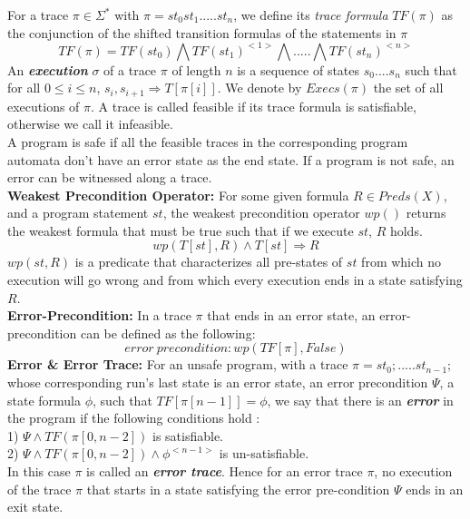\documentclass{article}
\begin{document}
For a trace $\pi \in \Sigma^*$ with $\pi = st_0st_1.....st_n$, we define its \textit{trace formula} $TF(\pi)$ as the conjunction of the shifted transition formulas of the statements in $\pi$
$$TF(\pi) = TF(st_0) \bigwedge TF(st_1)^{<1>} \bigwedge ..... \bigwedge TF(st_n)^{<n>}$$
An \textit{\textbf{execution}} $\sigma$ of a trace $\pi$ of length $n$ is a sequence of states $s_0....s_n$ such that for all $0 \leq i \leq n$, $s_i,s_{i+1} \Rightarrow T[\pi[i]]$. We denote by $Execs(\pi)$ the set of all executions of $\pi$.
A trace is called feasible if its trace formula is satisfiable, otherwise we call it infeasible. \\
A program is safe if all the feasible traces in the corresponding program automata don’t have an error state as the end state. If a program is not safe, an error can be witnessed along a trace.\\
\textbf{Weakest Precondition Operator:} For some given formula $R \in Preds(X)$, and a program statement $st$, the weakest precondition operator $wp()$ returns the weakest formula that must be true such that if we execute $st$, $R$ holds. 
$$wp(T[st],R) \wedge T[st] \Rightarrow R$$
$wp(st,R)$ is a predicate that characterizes all pre-states of $st$ from which no execution will go wrong and from which every execution ends in a state satisfying $R$.\\
\textbf{Error-Precondition:} In a trace $\pi$ that ends in an error state, an error-precondition can be defined as the following:
$$error\ precondition:wp(TF[\pi],False)$$
\textbf{Error \& Error Trace: }For an unsafe program, with a trace $\pi = st_0;.....st_{n-1};$ whose corresponding run's last state is an error state, an error precondition $\Psi$, a state formula $\phi$, such that $TF[\pi[n-1]]=\phi$, we say that there is an \textbf{\textit{error}} in the program if the following conditions hold :\\
1) $\Psi \wedge TF(\pi[0,n-2])$ is satisfiable.\\
2) $\Psi \wedge TF(\pi[0,n-2]) \wedge \phi^{<n-1>} $ is un-satisfiable.\\
In this case $\pi$ is called an \textbf{\textit{error trace}}. Hence for an error trace $\pi$, no execution of the trace $\pi$ that starts in a state satisfying the error pre-condition $\Psi$ ends in an exit state.\\
\end{document}
